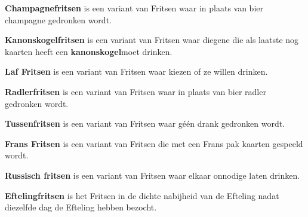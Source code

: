 
\newpage
\drawBar{}

\item \textbf{Champagnefritsen} is een variant van Fritsen waar in plaats van bier champagne gedronken wordt.

\item \textbf{Kanonskogelfritsen} is een variant van Fritsen waar diegene die als laatste nog kaarten heeft een \textbf{kanonskogel}\footnotemark[1] moet drinken.

\item \textbf{Laf Fritsen} is een variant van Fritsen waar \alleSpelers kiezen of ze willen drinken.

\item \textbf{Radlerfritsen} is een variant van Fritsen waar in plaats van bier radler gedronken wordt.

\item \textbf{Tussenfritsen} is een variant van Fritsen waar g\'e\'en drank gedronken wordt.

\item \textbf{Frans Fritsen} is een variant van Fritsen die met een Frans pak kaarten gespeeld wordt.

\item \textbf{Russisch fritsen} is een variant van Fritsen waar \alleSpelers elkaar onnodige laten drinken.

\item \textbf{Eftelingfritsen} is het Fritsen in de dichte nabijheid van de Efteling nadat \alleSpelers diezelfde dag de Efteling hebben bezocht.
\eindABCLijst



